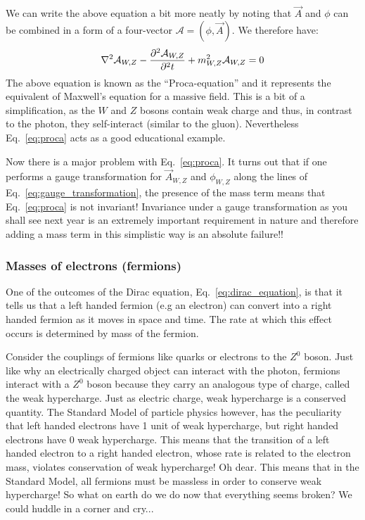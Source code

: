 We can write the above equation a bit more neatly by noting that $\vec{A}$ and $\phi$ can be combined in a form of a four-vector $\mathcal{A}=(\phi,\vec{A})$. We therefore have:
\begin{equation}
\label{eq:proca}
\nabla^{2}\mathcal{A}_{W,Z}-\frac{\partial^2\mathcal{A}_{W,Z}}{\partial^2t}+m_{W,Z}^2\mathcal{A}_{W,Z}=0\\
\end{equation}
The above equation is known as the ``Proca-equation'' and it represents the equivalent of Maxwell's equation for a massive field. This is a bit of a simplification, as the $W$ and $Z$ bosons contain weak charge and thus, in contrast to the photon, they self-interact (similar to the gluon). Nevertheless Eq.~\ref{eq:proca} acts as a good educational example.

Now there is a major problem with Eq.~\ref{eq:proca}. It turns out that if one performs a gauge transformation for $\vec{A}_{W,Z}$ and $\phi_{W,Z}$ along the lines of Eq.~\ref{eq:gauge_transformation}, the presence of the mass term means that Eq.~\ref{eq:proca} is not invariant! Invariance under a gauge transformation as you shall see next year is an extremely important requirement in nature and therefore adding a mass term
in this simplistic way is an absolute failure!!

\subsubsection{Masses of electrons (fermions)}
One of the outcomes of the Dirac equation, Eq.~\ref{eq:dirac_equation}, is that it tells us that a left handed fermion (e.g an electron) can convert into a right handed fermion as it moves in space and time. The rate at which this effect occurs is determined by mass of the fermion. 

Consider the couplings of fermions like quarks or electrons to the $Z^0$ boson. Just like why an electrically charged object can interact with the photon,  fermions interact with a $Z^0$ boson because they carry an analogous type of charge, called the weak hypercharge. Just as electric charge, weak hypercharge is a conserved quantity.
The Standard Model of particle physics however, has the peculiarity that left handed electrons have 1 unit of weak hypercharge, but right handed electrons have 0 weak hypercharge. This means that the transition of a left handed electron to a right handed electron, whose rate is related to the electron mass, violates conservation of weak hypercharge! Oh dear. This means that in the Standard Model, all fermions must be massless in order to conserve weak hypercharge! So what on earth do we do now that everything seems broken? We could huddle in a corner and cry...

